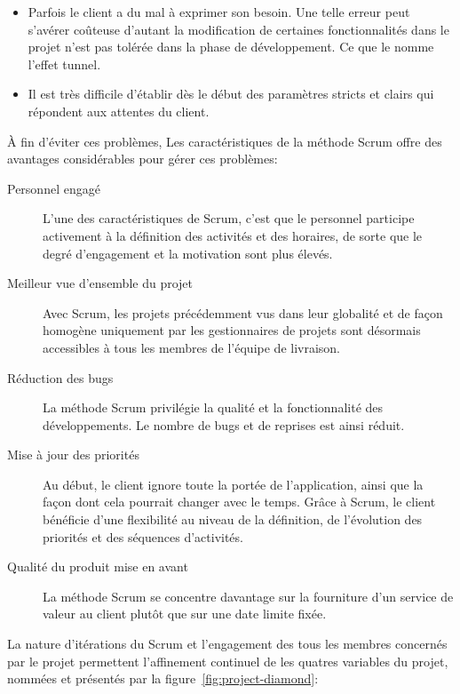 \begin{itemize}
    \item Parfois le client a du mal à exprimer son besoin. Une telle erreur
        peut s'avérer coûteuse d'autant la modification de certaines
        fonctionnalités dans le projet n'est pas tolérée dans la phase de
        développement. Ce que le nomme l'effet tunnel.
    \item Il est très difficile d'établir dès le début des paramètres stricts
        et clairs qui répondent aux attentes du client.
\end{itemize}

À fin d'éviter ces problèmes, Les caractéristiques de la méthode Scrum offre
des avantages considérables pour gérer ces problèmes:

\begin{description}
    \item [Personnel engagé] L'une des caractéristiques de Scrum, c'est que le
        personnel participe activement à la définition des activités et des
        horaires, de sorte que le degré d'engagement et la motivation sont plus
        élevés.
    \item [Meilleur vue d'ensemble du projet] Avec Scrum, les projets
        précédemment vus dans leur globalité et de façon homogène uniquement
        par les gestionnaires de projets sont désormais accessibles à tous les
        membres de l'équipe de livraison.
    \item [Réduction des bugs] La méthode Scrum privilégie la qualité et la
        fonctionnalité des développements. Le nombre de bugs et de reprises est
        ainsi réduit.
    \item [Mise à jour des priorités] Au début, le client ignore toute la
        portée de l'application, ainsi que la façon dont cela pourrait changer
        avec le temps. Grâce à Scrum, le client bénéficie d'une flexibilité au
        niveau de la définition, de l'évolution des priorités et des séquences
        d'activités.
    \item [Qualité du produit mise en avant] La méthode Scrum se concentre
        davantage sur la fourniture d'un service de valeur au client plutôt que
        sur une date limite fixée.
\end{description}

La nature d'itérations du Scrum et l'engagement des tous les membres concernés
par le projet permettent l'affinement continuel de les quatres variables du
projet, nommées  et présentés par la
figure~\ref{fig:project-diamond}:

